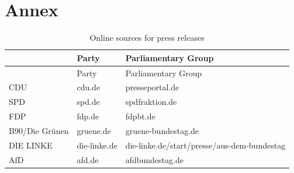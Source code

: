 \documentclass[
  12pt,
]{article}
\begin{document}
\newpage

\hypertarget{annex}{%
\section{Annex}\label{annex}}

\begin{longtable}[]{@{}lll@{}}
\caption{Online sources for press releases
\label{table:press_releases_sources}}\tabularnewline
\toprule
& Party & Parliamentary Group \\
\midrule
\endfirsthead
\toprule
& Party & Parliamentary Group \\
\midrule
\endhead
CDU & cdu.de & presseportal.de \\
SPD & spd.de & spdfraktion.de \\
FDP & fdp.de & fdpbt.de \\
B90/Die Grünen & gruene.de & gruene-bundestag.de \\
DIE LINKE & die-linke.de &
die-linke.de/start/presse/aus-dem-bundestag \\
AfD & afd.de & afdbundestag.de \\
\bottomrule
\end{longtable}
\end{document}

